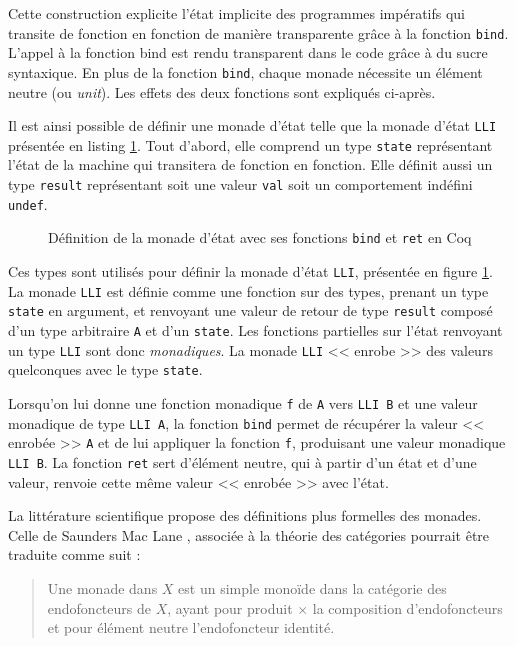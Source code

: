 				Cette construction explicite l'état implicite des programmes impératifs qui transite de fonction en fonction de manière transparente grâce à la fonction \texttt{bind}. L'appel à la fonction bind est rendu transparent dans le code grâce à du sucre syntaxique. En plus de la fonction \texttt{bind}, chaque monade nécessite un élément neutre (ou \emph{unit}). Les effets des deux fonctions sont expliqués ci-après.

				Il est ainsi possible de définir une monade d'état telle que la monade d'état \texttt{LLI} présentée en listing \ref{code:monad}. Tout d'abord, elle comprend un type \texttt{state} représentant l'état de la machine qui transitera de fonction en fonction. Elle définit aussi un type \texttt{result} représentant soit une valeur \texttt{val} soit un comportement indéfini \texttt{undef}.

\begin{figure}[!h]
	\caption{Définition de la monade d'état avec ses fonctions \texttt{bind} et \texttt{ret} en Coq}
	\label{code:monad}
\end{figure}

Ces types sont utilisés pour définir la monade d'état \texttt{LLI}, présentée en figure \ref{code:monad}. La monade \texttt{LLI} est définie comme une fonction sur des types, prenant un type \texttt{state} en argument, et renvoyant une valeur de retour de type \texttt{result} composé d'un type arbitraire \texttt{A} et d'un \texttt{state}. Les fonctions partielles sur l'état renvoyant un type \texttt{LLI} sont donc \emph{monadiques}. La monade \texttt{LLI} << enrobe >> des valeurs quelconques avec le type \texttt{state}.

Lorsqu'on lui donne une fonction monadique \texttt{f} de \texttt{A} vers \texttt{LLI B} et une valeur monadique de type \texttt{LLI A}, la fonction \texttt{bind} permet de récupérer la valeur << enrobée >> \texttt{A} et de lui appliquer la fonction \texttt{f}, produisant une valeur monadique \texttt{LLI B}. La fonction \texttt{ret} sert d'élément neutre, qui à partir d'un état et d'une valeur, renvoie cette même valeur << enrobée >> avec l'état.

La littérature scientifique propose des définitions plus formelles des monades. Celle de Saunders Mac Lane \cite[134]{mac2013categories}, associée à la théorie des catégories pourrait être traduite comme suit :

\blockquote{Une monade dans $X$ est un simple monoïde dans la catégorie des endofoncteurs de $X$, ayant pour produit $\times$ la composition d'endofoncteurs et pour élément neutre l'endofoncteur identité.}

